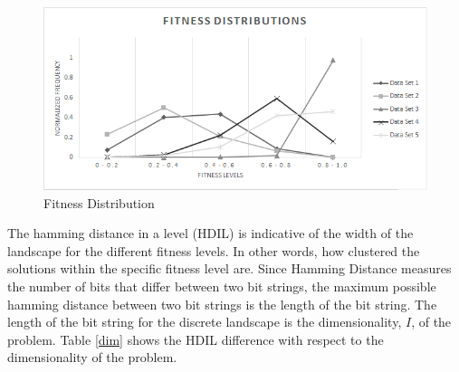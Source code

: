 \documentclass[journal,comsoc]{IEEEtran}
\begin{document}
\begin{figure}[H]
\label{fitness-dist}
\caption{Fitness Distribution}
\includegraphics[width=\linewidth]{fitness-dist}
\end{figure}

The hamming distance in a level (HDIL) is indicative of the width of the landscape for the different fitness levels. In other words, how clustered the solutions within the specific fitness level are. Since Hamming Distance measures the number of bits that differ between two bit strings, the maximum possible hamming distance between two bit strings is the length of the bit string. The length of the bit string for the discrete landscape is the dimensionality,  $I$, of the problem.
Table \ref{dim} shows the HDIL difference with respect to the dimensionality of the problem.
\end{document}

